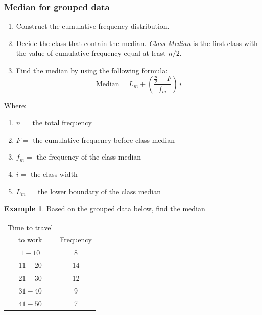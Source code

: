 \documentclass[11pt,a4paper]{article}
\theoremstyle{definition}
\newtheorem{example}[thm]{Example}
\begin{document}
\subsubsection{Median for grouped data}
\begin{enumerate}
\item[\textit{Step 1:}] Construct the cumulative frequency distribution.
\item[\textit{Step 2:}] Decide the class that contain the median. \textit{Class Median} is the first class with the value of cumulative frequency equal at least $n/2$.
\item[\textit{Step 3:}] Find the median by using the following formula:
   \[\text{Median} = L_m + \left(\frac{\frac{n}{2}-F}{f_m}\right)\, i\]
\end{enumerate}



Where:
\begin{enumerate}
\item[]$n = $ the total frequency
\item[]$F = $ the cumulative frequency before class median
\item[]$f_m = $ the frequency of the class median
\item[]$i = $ the class width
\item[]$L_m = $ the lower boundary of the class median\\
\end{enumerate}




\begin{example}
Based on the grouped data below, find the median
\begin{table}[H]
\centering
\begin{tabular}{|c|c|}
\hline
Time to travel & \\
to work        & Frequency\\
\hline
$1 - 10$ & 8\\
$11 - 20$ & 14\\
$21 - 30$ & 12\\
$31 - 40$ & 9\\
$41 - 50$ & 7\\
\hline
\end{tabular}
\end{table}
\vspace{0.5cm}
\end{example}
\end{document}
